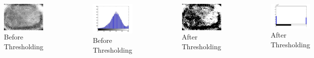 \documentclass[12pt]{beamer}
\begin{document}
\subsection{}
\begin{frame}[c]
\frametitle{}
\begin{columns}[t]
 \begin{figure}
 \centering
 \includegraphics[width=4cm]{./th22.jpg}
 \vskip-10pt
 \caption{Before Thresholding}
\end{figure}
 \begin{figure}
 \centering
 \vskip-20pt
 \includegraphics[width=4cm]{./th24.jpg}
 \vskip-10pt
 \caption{Before Thresholding}
\end{figure}
 \begin{figure}
 \centering
 \includegraphics[width=4cm]{./th23.jpg}
 \vskip-10pt
 \caption{After Thresholding}
\end{figure}
 \begin{figure}
 \centering
 \vskip-20pt
 \includegraphics[width=4.5cm]{./th25.jpg}
 \vskip-10pt
 \caption{After Thresholding}
\end{figure}
\end{columns}
\end{frame}
\end{document}
